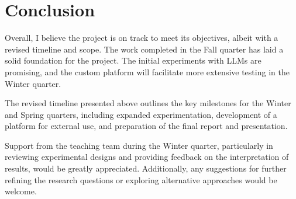 \documentclass[12pt, letterpaper]{article}
\begin{document}
\section{Conclusion}

Overall, I believe the project is on track to meet its objectives, albeit with a revised timeline and scope. The work completed in the Fall quarter has laid a solid foundation for the project. The initial experiments with LLMs are promising, and the custom platform will facilitate more extensive testing in the Winter quarter.

The revised timeline presented above outlines the key milestones for the Winter and Spring quarters, including expanded experimentation, development of a platform for external use, and preparation of the final report and presentation.

Support from the teaching team during the Winter quarter, particularly in reviewing experimental designs and providing feedback on the interpretation of results, would be greatly appreciated. Additionally, any suggestions for further refining the research questions or exploring alternative approaches would be welcome.
\end{document}

